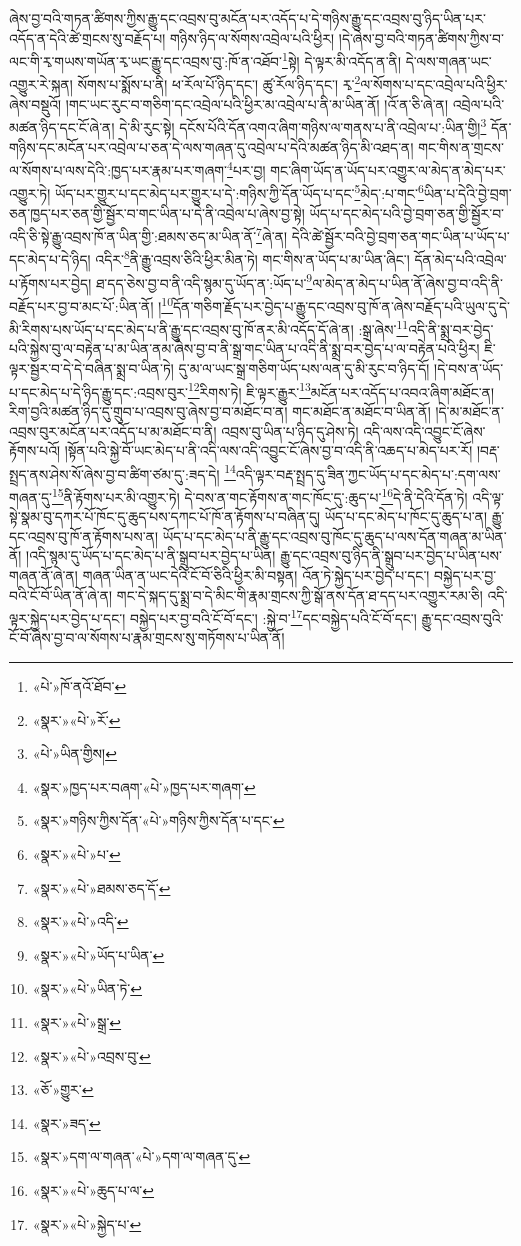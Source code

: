 ཞེས་བྱ་བའི་གཏན་ཚིགས་ཀྱིས་རྒྱུ་དང་འབྲས་བུ་མངོན་པར་འདོད་པ་དེ་གཉིས་རྒྱུ་དང་འབྲས་བུ་ཉིད་ཡིན་པར་འདོད་ན་དེའི་ཚེ་གྲངས་སུ་བརྗོད་པ། གཉིས་ཉིད་ལ་སོགས་འབྲེལ་པའི་ཕྱིར། །དེ་ཞེས་བྱ་བའི་གཏན་ཚིགས་ཀྱིས་བ་ལང་གི་རྭ་གཡས་གཡོན་རྭ་ཡང་རྒྱུ་དང་འབྲས་བུ་:ཁོ་ན་འཐོབ་\footnote{«པེ་»ཁོ་ནའོ་ཐོབ་}སྟེ། དེ་ལྟར་མི་འདོད་ན་ནི། དེ་ལས་གཞན་ཡང་འགྱུར་རེ་སྐན། སོགས་པ་སྨོས་པ་ནི། ཕ་རོལ་པོ་ཉིད་དང་། ཚུ་རོལ་ཉིད་དང་། རྭ་\footnote{«སྣར་»«པེ་»རོ་}ལ་སོགས་པ་དང་འབྲེལ་པའི་ཕྱིར་ཞེས་བསྡུའོ། །གང་ཡང་རུང་བ་གཅིག་དང་འབྲེལ་པའི་ཕྱིར་མ་འབྲེལ་པ་ནི་མ་ཡིན་ནོ། །འོ་ན་ཅི་ཞེ་ན། འབྲེལ་པའི་མཚན་ཉིད་དང་ངོ་ཞེ་ན། དེ་མི་རུང་སྟེ། དངོས་པོའི་དོན་འགའ་ཞིག་གཉིས་ལ་གནས་པ་ནི་འབྲེལ་པ་:ཡིན་གྱི།\footnote{«པེ་»ཡིན་གྱིས།} དོན་གཉིས་དང་མངོན་པར་འབྲེལ་པ་ཅན་དེ་ལས་གཞན་དུ་འབྲེལ་པ་དེའི་མཚན་ཉིད་མི་འཐད་ན། གང་གིས་ན་གྲངས་ལ་སོགས་པ་ལས་དེའི་:ཁྱད་པར་རྣམ་པར་གཞག་\footnote{«སྣར་»ཁྱད་པར་བཞག་«པེ་»ཁྱད་པར་གཞག་}པར་བྱ། གང་ཞིག་ཡོད་ན་ཡོད་པར་འགྱུར་ལ་མེད་ན་མེད་པར་འགྱུར་ཏེ། ཡོད་པར་གྱུར་པ་དང་མེད་པར་གྱུར་པ་དེ་:གཉིས་ཀྱི་དོན་ཡོད་པ་དང་\footnote{«སྣར་»གཉིས་ཀྱིས་དོན་«པེ་»གཉིས་ཀྱིས་དོན་པ་དང་}མེད་:པ་གང་\footnote{«སྣར་»«པེ་»པ་}ཡིན་པ་དེའི་བྱེ་བྲག་ཅན་ཁྱད་པར་ཅན་གྱི་སྦྱོར་བ་གང་ཡིན་པ་དེ་ནི་འབྲེལ་པ་ཞེས་བྱ་སྟེ། ཡོད་པ་དང་མེད་པའི་བྱེ་བྲག་ཅན་གྱི་སྦྱོར་བ་འདི་ཅི་སྟེ་རྒྱུ་འབྲས་ཁོ་ན་ཡིན་གྱི་:ཐམས་ཅད་མ་ཡིན་ནོ་\footnote{«སྣར་»«པེ་»ཐམས་ཅད་དོ་}ཞེ་ན། དེའི་ཚེ་སྦྱོར་བའི་བྱེ་བྲག་ཅན་གང་ཡིན་པ་ཡོད་པ་དང་མེད་པ་དེ་ཉིད། འདིར་\footnote{«སྣར་»«པེ་»འདི་}ནི་རྒྱུ་འབྲས་ཅིའི་ཕྱིར་མིན་ཏེ། གང་གིས་ན་ཡོད་པ་མ་ཡིན་ཞིང་། དོན་མེད་པའི་འབྲེལ་པ་རྟོགས་པར་བྱེད། ཐ་དད་ཅེས་བྱ་བ་ནི་འདི་སྙམ་དུ་ཡོད་ན་:ཡོད་པ་\footnote{«སྣར་»«པེ་»ཡོད་པ་ཡིན་}ལ་མེད་ན་མེད་པ་ཡིན་ནོ་ཞེས་བྱ་བ་འདི་ནི་བརྗོད་པར་བྱ་བ་མང་པོ་:ཡིན་ནོ། །\footnote{«སྣར་»«པེ་»ཡིན་ཏེ་}དོན་གཅིག་རྗོད་པར་བྱེད་པ་རྒྱུ་དང་འབྲས་བུ་ཁོ་ན་ཞེས་བརྗོད་པའི་ཡུལ་དུ་དེ་མི་རིགས་པས་ཡོད་པ་དང་མེད་པ་ནི་རྒྱུ་དང་འབྲས་བུ་ཁོ་ནར་མི་འདོད་དོ་ཞེ་ན། :སྒྲ་ཞེས་\footnote{«སྣར་»«པེ་»སྒྲ་}འདི་ནི་སྨྲ་བར་བྱེད་པའི་སྐྱེས་བུ་ལ་བརྟེན་པ་མ་ཡིན་ནམ་ཞེས་བྱ་བ་ནི་སྒྲ་གང་ཡིན་པ་འདི་ནི་སྨྲ་བར་བྱེད་པ་ལ་བརྟེན་པའི་ཕྱིར། ཇི་ལྟར་སྦྱར་བ་དེ་དེ་བཞིན་སྨྲ་བ་ཡིན་ཏེ། དུ་མ་ལ་ཡང་སྒྲ་གཅིག་ཡོད་པས་ལན་དུ་མི་རུང་བ་ཉིད་དོ། །དེ་བས་ན་ཡོད་པ་དང་མེད་པ་དེ་ཉིད་རྒྱུ་དང་:འབྲས་བུར་\footnote{«སྣར་»«པེ་»འབྲས་བུ་}རིགས་ཏེ། ཇི་ལྟར་རྒྱུར་\footnote{«ཅོ་»གྱུར་}མངོན་པར་འདོད་པ་འབའ་ཞིག་མཐོང་ན། རིག་བྱའི་མཚན་ཉིད་དུ་གྲུབ་པ་འབྲས་བུ་ཞེས་བྱ་བ་མཐོང་བ་ན། གང་མཐོང་ན་མཐོང་བ་ཡིན་ནོ། །དེ་མ་མཐོང་ན་འབྲས་བུར་མངོན་པར་འདོད་པ་མ་མཐོང་བ་ནི། འབྲས་བུ་ཡིན་པ་ཉིད་དུ་ཤེས་ཏེ། འདི་ལས་འདི་འབྱུང་ངོ་ཞེས་རྟོགས་པའོ། །སྟོན་པའི་སྐྱེ་བོ་ཡང་མེད་པ་ནི་འདི་ལས་འདི་འབྱུང་ངོ་ཞེས་བྱ་བ་འདི་ནི་འཆད་པ་མེད་པར་རོ། །བརྡ་སྤྲད་ནས་ཤེས་སོ་ཞེས་བྱ་བ་ཚིག་ཙམ་དུ་:ཟད་དེ། \footnote{«སྣར་»ཟད་}འདི་ལྟར་བརྡ་སྤྲད་དུ་ཟིན་ཀྱང་ཡོད་པ་དང་མེད་པ་:དག་ལས་གཞན་དུ་\footnote{«སྣར་»དག་ལ་གཞན་«པེ་»དག་ལ་གཞན་དུ་}ནི་རྟོགས་པར་མི་འགྱུར་ཏེ། དེ་བས་ན་གང་རྟོགས་ན་གང་ཁོང་དུ་:ཆུད་པ་\footnote{«སྣར་»«པེ་»ཆུད་པ་ལ་}དེ་ནི་དེའི་དོན་ཏེ། འདི་ལྟ་སྟེ་སྣམ་བུ་དཀར་པོ་ཁོང་དུ་ཆུད་པས་དཀང་པོ་ཁོ་ན་རྟོགས་པ་བཞིན་དུ། ཡོད་པ་དང་མེད་པ་ཁོང་དུ་ཆུད་པ་ན། རྒྱུ་དང་འབྲས་བུ་ཁོ་ན་རྟོགས་པས་ན། ཡོད་པ་དང་མེད་པ་ནི་རྒྱུ་དང་འབྲས་བུ་ཁོང་དུ་ཆུད་པ་ལས་དོན་གཞན་མ་ཡིན་ནོ། །འདི་སྙམ་དུ་ཡོད་པ་དང་མེད་པ་ནི་སྒྲུབ་པར་བྱེད་པ་ཡིན། རྒྱུ་དང་འབྲས་བུ་ཉིད་ནི་སྒྲུབ་པར་བྱེད་པ་ཡིན་པས་གཞན་ནོ་ཞེ་ན། གཞན་ཡིན་ན་ཡང་དེའི་ངོ་བོ་ཅིའི་ཕྱིར་མི་བསྟན། འོན་ཏེ་སྐྱེད་པར་བྱེད་པ་དང་། བསྐྱེད་པར་བྱ་བའི་ངོ་བོ་ཡིན་ནོ་ཞེ་ན། གང་དེ་སྐད་དུ་སྨྲ་བ་དེ་མིང་གི་རྣམ་གྲངས་ཀྱི་སྒོ་ནས་དོན་ཐ་དད་པར་འགྱུར་རམ་ཅི། འདི་ལྟར་སྐྱེད་པར་བྱེད་པ་དང་། བསྐྱེད་པར་བྱ་བའི་ངོ་བོ་དང་། :སྐྱེ་བ་\footnote{«སྣར་»«པེ་»སྐྱེད་པ་}དང་བསྐྱེད་པའི་ངོ་བོ་དང་། རྒྱུ་དང་འབྲས་བུའི་ངོ་བོ་ཞེས་བྱ་བ་ལ་སོགས་པ་རྣམ་གྲངས་སུ་གཏོགས་པ་ཡིན་ནོ། 